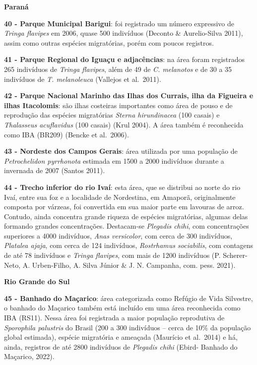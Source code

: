 \documentclass[
  oneside]{scrbook}
\begin{document}
\textbf{Paraná}

\textbf{40 - Parque Municipal Barigui}: foi registrado um número expressivo de \emph{Tringa flavipes} em 2006, quase 500 indivíduos (Deconto \& Aurelio-Silva 2011), assim como outras espécies migratórias, porém com poucos registros.

\textbf{41 - Parque Regional do Iguaçu e adjacências}: na área foram registrados 265 indivíduos de \emph{Tringa flavipes}, além de 49 de \emph{C. melanotos} e de 30 a 35 indivíduos de \emph{T. melanoleuca} (Vallejos et al.~2011).

\textbf{42 - Parque Nacional Marinho das Ilhas dos Currais, ilha da Figueira e ilhas Itacolomis}: são ilhas costeiras importantes como área de pouso e de reprodução das espécies migratórias \emph{Sterna hirundinacea} (100 casais) e \emph{Thalasseus acuflavidus} (100 casais) (Krul 2004). A área também é reconhecida como IBA (BR209) (Bencke et al.~2006).

\textbf{43 - Nordeste dos Campos Gerais}: área utilizada por uma população de \emph{Petrochelidon pyrrhonota} estimada em 1500 a 2000 indivíduos durante a invernada de 2007 (Santos 2011).

\textbf{44 - Trecho inferior do rio Ivaí}: esta área, que se distribui ao norte do rio Ivaí, entre sua foz e a localidade de Nordestina, em Amaporã, originalmente composta por várzeas, foi convertida em sua maior parte em lavouras de arroz. Contudo, ainda concentra grande riqueza de espécies migratórias, algumas delas formando grandes concentrações. Destacam-se \emph{Plegadis chihi}, com concentrações superiores a 4000 indivíduos, \emph{Anas versicolor}, com cerca de 300 indivíduos, \emph{Platalea ajaja}, com cerca de 124 indivíduos, \emph{Rostrhamus sociabilis}, com contagens de até 78 indivíduos e \emph{Tringa flavipes}, com mais de 1200 indivíduos (P. Scherer-Neto, A. Urben-Filho, A. Silva Júnior \& J. N. Campanha, com. pess. 2021).

\textbf{Rio Grande do Sul}

\textbf{45 - Banhado do Maçarico}: área categorizada como Refúgio de Vida Silvestre, o banhado do Maçarico também está incluído em uma área reconhecida como IBA (RS11). Nessa área foi registrada a maior população reprodutiva de \emph{Sporophila palustris} do Brasil (200 a 300 indivíduos -- cerca de 10\% da população global estimada), espécie migratória e ameaçada (Maurício et al.~2014) e há, ainda, registros de até 2800 indivíduos de \emph{Plegadis chihi} (Ebird- Banhado do Maçarico, 2022).
\end{document}
